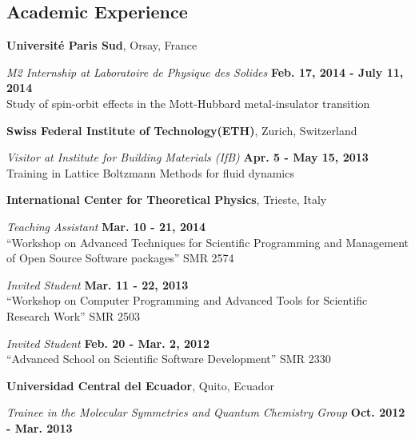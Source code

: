 \documentclass[margin,line]{res}
\newenvironment{list1}{
  \begin{list}{\ding{113}}{%
      \setlength{\itemsep}{0in}
      \setlength{\parsep}{0in} \setlength{\parskip}{0in}
      \setlength{\topsep}{0in} \setlength{\partopsep}{0in}
      \setlength{\leftmargin}{0.17in}}}{\end{list}}
\begin{document}
\begin{resume}
\section{\sc Academic Experience}
  {\bf Université Paris Sud}, Orsay, France
  \begin{list1}
    \item[] {\em M2 Internship at Laboratoire de Physique des Solides}
\hfill {\bf Feb. 17, 2014 - July 11, 2014}\\
Study of spin-orbit effects in the Mott-Hubbard metal-insulator transition
  \end{list1}

  {\bf Swiss Federal Institute of Technology(ETH)}, Zurich, Switzerland
  \begin{list1}
    \item[] {\em Visitor at Institute for Building Materials (IfB)} \hfill {\bf
Apr. 5 - May 15, 2013}\\
    Training in Lattice Boltzmann Methods for fluid dynamics
  \end{list1}

  {\bf International Center for Theoretical Physics}, Trieste, Italy
  \begin{list1}
    \item[] {\em Teaching Assistant} \hfill {\bf Mar. 10 - 21, 2014} \\
    ``Workshop on Advanced Techniques for Scientific Programming and
Management of Open Source Software packages'' SMR 2574
    \item[] {\em Invited Student} \hfill {\bf Mar. 11 - 22, 2013} \\
    ``Workshop on Computer Programming and Advanced Tools for Scientific
    Research Work'' SMR 2503
    \item[] {\em Invited Student} \hfill {\bf Feb. 20 - Mar. 2, 2012} \\
    ``Advanced School on Scientific Software Development'' SMR 2330
  \end{list1}

  {\bf Universidad Central del Ecuador}, Quito, Ecuador
  \begin{list1}
    \item[] {\em Trainee in the Molecular Symmetries and Quantum Chemistry Group} \hfill {\bf Oct. 2012 - Mar. 2013}
  \end{list1}


\end{resume}
\end{document}
